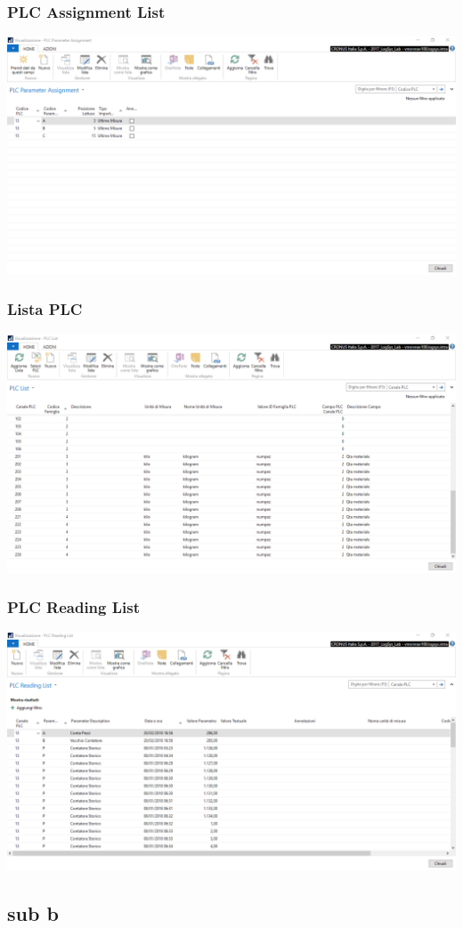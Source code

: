 \documentclass{beamer}
\begin{document}
\begin{frame}
\frametitle{PLC Assignment List}
\includegraphics[width=1\textwidth]{images/PLCAssignmentList.png}
\end{frame}

\begin{frame}
\frametitle{Lista PLC}
\includegraphics[width=1\textwidth]{images/PLCList.png}
\end{frame}

\begin{frame}
\frametitle{PLC Reading List}
\includegraphics[width=1\textwidth]{images/PLCReadingList.png}
\end{frame}


\subsection{sub b}
\end{document}
